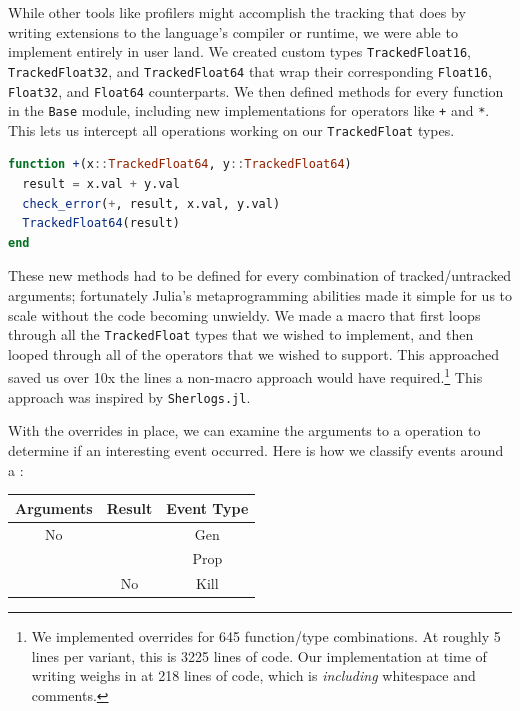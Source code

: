 \documentclass{juliacon}
\begin{document}
While other tools like profilers might accomplish the tracking that \FT{} does by writing extensions to the language's compiler or runtime, we were able to implement \FT{} entirely in user land.
We created custom types \texttt{TrackedFloat16}, \texttt{TrackedFloat32}, and \texttt{TrackedFloat64} that wrap their corresponding \texttt{Float16}, \texttt{Float32}, and \texttt{Float64} counterparts.
We then defined methods for every function in the \texttt{Base} module, including new implementations for operators like \texttt{+} and \texttt{*}.
This lets us intercept all \fp{} operations working on our \texttt{TrackedFloat} types.

\begin{lstlisting}[language = Julia]
function +(x::TrackedFloat64, y::TrackedFloat64)
  result = x.val + y.val
  check_error(+, result, x.val, y.val)
  TrackedFloat64(result)
end
\end{lstlisting}

These new methods had to be defined for every combination of tracked/untracked arguments;
fortunately Julia's metaprogramming abilities made it simple for us to scale without the code becoming unwieldy.
We made a macro that first loops through all the \texttt{TrackedFloat} types that we wished to implement, and then looped through all of the operators that we wished to support.
This approached saved us over 10x the lines a non-macro approach would have required.\footnote{We implemented overrides for 645 function/type combinations. At roughly 5 lines per variant, this is 3225 lines of code. Our implementation at time of writing weighs in at 218 lines of code, which is \emph{including} whitespace and comments.}
This approach was inspired by \texttt{Sherlogs.jl}.\cite{kMilanklSherlogsJl2021}

With the overrides in place, we can examine the arguments to a \fp{} operation to determine if an interesting event occurred.
Here is how we classify events around a \NaN{}:

\begin{center}
  \begin{tabular}{ccc}
    Arguments & Result & Event Type \\
    \hline
    No \NaN{} & \NaN{} & Gen \\
    \NaN{} & \NaN{} & Prop \\
    \NaN{} & No \NaN{} & Kill \\
  \end{tabular}
\end{center}
\end{document}

